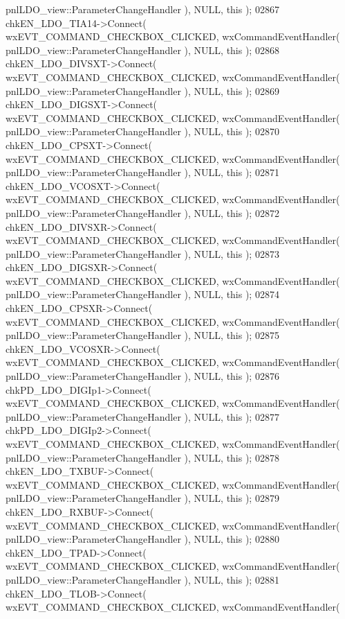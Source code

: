 \begin{DoxyCode}
      pnlLDO_view::ParameterChangeHandler ), NULL, \textcolor{keyword}{this} );
02867     chkEN_LDO_TIA14->Connect( wxEVT\_COMMAND\_CHECKBOX\_CLICKED, wxCommandEventHandler( 
      pnlLDO_view::ParameterChangeHandler ), NULL, \textcolor{keyword}{this} );
02868     chkEN_LDO_DIVSXT->Connect( wxEVT\_COMMAND\_CHECKBOX\_CLICKED, wxCommandEventHandler( 
      pnlLDO_view::ParameterChangeHandler ), NULL, \textcolor{keyword}{this} );
02869     chkEN_LDO_DIGSXT->Connect( wxEVT\_COMMAND\_CHECKBOX\_CLICKED, wxCommandEventHandler( 
      pnlLDO_view::ParameterChangeHandler ), NULL, \textcolor{keyword}{this} );
02870     chkEN_LDO_CPSXT->Connect( wxEVT\_COMMAND\_CHECKBOX\_CLICKED, wxCommandEventHandler( 
      pnlLDO_view::ParameterChangeHandler ), NULL, \textcolor{keyword}{this} );
02871     chkEN_LDO_VCOSXT->Connect( wxEVT\_COMMAND\_CHECKBOX\_CLICKED, wxCommandEventHandler( 
      pnlLDO_view::ParameterChangeHandler ), NULL, \textcolor{keyword}{this} );
02872     chkEN_LDO_DIVSXR->Connect( wxEVT\_COMMAND\_CHECKBOX\_CLICKED, wxCommandEventHandler( 
      pnlLDO_view::ParameterChangeHandler ), NULL, \textcolor{keyword}{this} );
02873     chkEN_LDO_DIGSXR->Connect( wxEVT\_COMMAND\_CHECKBOX\_CLICKED, wxCommandEventHandler( 
      pnlLDO_view::ParameterChangeHandler ), NULL, \textcolor{keyword}{this} );
02874     chkEN_LDO_CPSXR->Connect( wxEVT\_COMMAND\_CHECKBOX\_CLICKED, wxCommandEventHandler( 
      pnlLDO_view::ParameterChangeHandler ), NULL, \textcolor{keyword}{this} );
02875     chkEN_LDO_VCOSXR->Connect( wxEVT\_COMMAND\_CHECKBOX\_CLICKED, wxCommandEventHandler( 
      pnlLDO_view::ParameterChangeHandler ), NULL, \textcolor{keyword}{this} );
02876     chkPD_LDO_DIGIp1->Connect( wxEVT\_COMMAND\_CHECKBOX\_CLICKED, wxCommandEventHandler( 
      pnlLDO_view::ParameterChangeHandler ), NULL, \textcolor{keyword}{this} );
02877     chkPD_LDO_DIGIp2->Connect( wxEVT\_COMMAND\_CHECKBOX\_CLICKED, wxCommandEventHandler( 
      pnlLDO_view::ParameterChangeHandler ), NULL, \textcolor{keyword}{this} );
02878     chkEN_LDO_TXBUF->Connect( wxEVT\_COMMAND\_CHECKBOX\_CLICKED, wxCommandEventHandler( 
      pnlLDO_view::ParameterChangeHandler ), NULL, \textcolor{keyword}{this} );
02879     chkEN_LDO_RXBUF->Connect( wxEVT\_COMMAND\_CHECKBOX\_CLICKED, wxCommandEventHandler( 
      pnlLDO_view::ParameterChangeHandler ), NULL, \textcolor{keyword}{this} );
02880     chkEN_LDO_TPAD->Connect( wxEVT\_COMMAND\_CHECKBOX\_CLICKED, wxCommandEventHandler( 
      pnlLDO_view::ParameterChangeHandler ), NULL, \textcolor{keyword}{this} );
02881     chkEN_LDO_TLOB->Connect( wxEVT\_COMMAND\_CHECKBOX\_CLICKED, wxCommandEventHandler( 

\end{DoxyCode}
